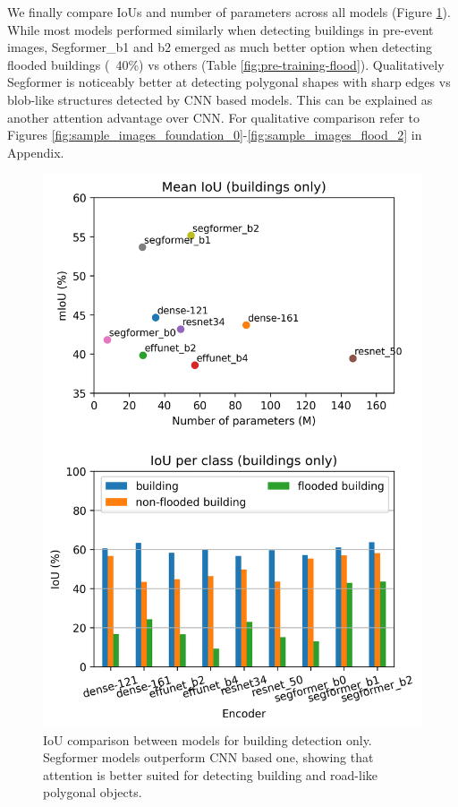 \documentclass[10pt,twocolumn,letterpaper]{article}
\begin{document}
We finally compare IoUs and number of parameters across all models (Figure \ref{fig:iou_vs_model}). While most models performed similarly when detecting buildings in pre-event images, Segformer\_b1 and b2  emerged as much better option when detecting flooded buildings (~40\%) vs others (Table \ref{fig:pre-training-flood}). Qualitatively Segformer is noticeably better at detecting polygonal shapes with sharp edges vs blob-like structures detected by CNN based models. This can be explained as another attention advantage over CNN. For qualitative comparison refer to Figures \ref{fig:sample_images_foundation_0}-\ref{fig:sample_images_flood_2} in Appendix.

\begin{figure}[t]
  \centering
   \includegraphics[width=1.1\linewidth]{figures/iou_vs_model.png}
   \caption{IoU comparison between models for building detection only. Segformer models outperform CNN based one, showing that attention is better suited for detecting building and road-like polygonal objects.}
   \label{fig:iou_vs_model}
\end{figure}
\end{document}
